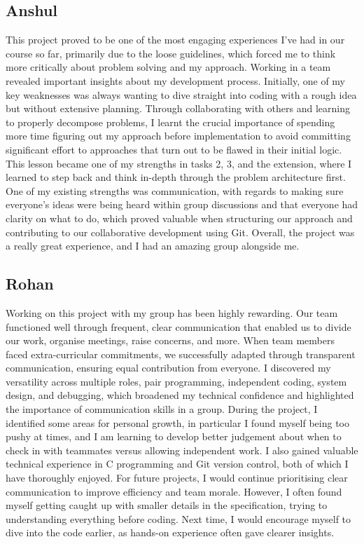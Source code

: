 \documentclass[11pt]{article}
\begin{document}
\subsection{Anshul}
This project proved to be one of the most engaging experiences I've had in our course so far, primarily due to the loose guidelines, which forced me to think more critically about problem solving and my approach. Working in a team revealed important insights about my development process. Initially, one of my key weaknesses was always wanting to dive straight into coding with a rough idea but without extensive planning. Through collaborating with others and learning to properly decompose problems, I learnt the crucial importance of spending more time figuring out my approach before implementation to avoid committing significant effort to approaches that turn out to be flawed in their initial logic. This lesson became one of my strengths in tasks 2, 3, and the extension, where I learned to step back and think in-depth through the problem architecture first. One of my existing strengths was communication, with regards to making sure everyone's ideas were being heard within group discussions and that everyone had clarity on what to do, which proved valuable when structuring our approach and contributing to our collaborative development using Git. Overall, the project was a really great experience, and I had an amazing group alongside me.

\subsection{Rohan}
Working on this project with my group has been highly rewarding. Our team functioned well through frequent, clear communication that enabled us to divide our work, organise meetings, raise concerns, and more. When team members faced extra-curricular commitments, we successfully adapted through transparent communication, ensuring equal contribution from everyone. I discovered my versatility across multiple roles, pair programming, independent coding, system design, and debugging, which broadened my technical confidence and highlighted the importance of communication skills in a group. During the project, I identified some areas for personal growth, in particular I found myself being too pushy at times, and I am learning to develop better judgement about when to check in with teammates versus allowing independent work. I also gained valuable technical experience in C programming and Git version control, both of which I have thoroughly enjoyed. For future projects, I would continue prioritising clear communication to improve efficiency and team morale. However, I often found myself getting caught up with smaller details in the specification, trying to understanding everything before coding. Next time, I would encourage myself to dive into the code earlier, as hands-on experience often gave clearer insights.

 
\end{document}
